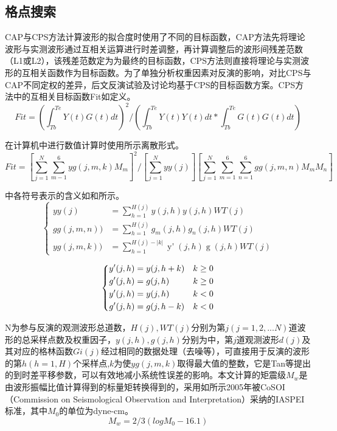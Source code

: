 \subsection{格点搜索}

CAP与CPS方法计算波形的拟合度时使用了不同的目标函数，CAP方法先将理论波形与实测波形通过互相关运算进行时差调整，再计算调整后的波形间残差范数（L1或L2）\citep{Zhao1994}，该残差范数定为为最终的目标函数，CPS方法则直接将理论与实测波形的互相关函数作为目标函数。为了单独分析权重因素对反演的影响，对比CPS与CAP不同定权的差异，后文反演试验及讨论均基于CPS的目标函数方案。CPS方法中的互相关目标函数Fit如定义。
\begin{equation}
\label{eq2_12}
Fit=(\int_{Tb}^{Te}Y(t)G(t)dt)^2/(\int_{Tb}^{Te}Y(t)Y(t)dt*\int_{Tb}^{Te}G(t)G(t)dt)
\end{equation}

在计算机中进行数值计算时使用所示离散形式。
\begin{equation}
\label{eq2_13}
Fit=[\sum_{j=1}^{N}\sum_{m-1}^{6}yg(j,m,k)M_m]^2/{[\sum_{j=1}^{N}yy(j)][\sum_{j=1}^{N}\sum_{m=1}^{6}\sum_{n=1}^{6}gg(j,m,n)M_mM_n]}
\end{equation}

中各符号表示的含义如和所示。
\begin{equation}
\label{eq2_14}
\left\{
    \begin{aligned}
    yy(j)&=\sum_{h=1}^{H(j)}y(j,h)y(j,h)WT(j)\\
    gg(j,m,n))&=\sum_{h=1}^{H(j)}g_{m}(j,h)g_{n}(j,h)WT(j)\\
    yg(j,m,k))&=\sum_{h=1}^{H(j)-|k|}\mathop{{y}'}(j,h)\mathop{{g}'_{m}}(j,h)WT(j)
    \end{aligned}
\right.
\end{equation}

\begin{equation}
\label{eq2_15}
\left\{
    \begin{aligned}
    \mathop{{y}'}(j,h)&=y(j,h+k) &k\geq0 \\
    \mathop{{g}'}(j,h)&=g(j,h)   &k\geq0 \\
    \mathop{{y}'}(j,h)&=y(j,h)   &k<0 \\
    \mathop{{g}'}(j,h)&=g(j,h-k) &k<0 \\
    \end{aligned}   \\
\right.
\end{equation}

N为参与反演的观测波形总道数，$H(j),WT(j)$分别为第$j(j=1,2,...N)$道波形的总采样点数及权重因子，$y(j,h),g(j,h)$分别为中，第$j$道观测波形$d(j)$及其对应的格林函数$Gi(j)$经过相同的数据处理（去噪等），可直接用于反演的波形的第$h(h=1,H)$个采样点,$k$为使$yg(j,m,k)$取得最大值的整数，它是Tan等\citep{Tan2006}提出的到时差平移参数，可以有效地减小系统性误差的影响。本文计算的矩震级$M_w$是由波形振幅比值计算得到的标量矩转换得到的，采用如所示2005年被CoSOI（Commission on Seismological Observation and Interpretation）采纳的IASPEI标准，其中$M_0$的单位为dyne-cm。
\begin{equation}
\label{eq2_16}
	M_w=2/3(logM_0-16.1)
\end{equation}

